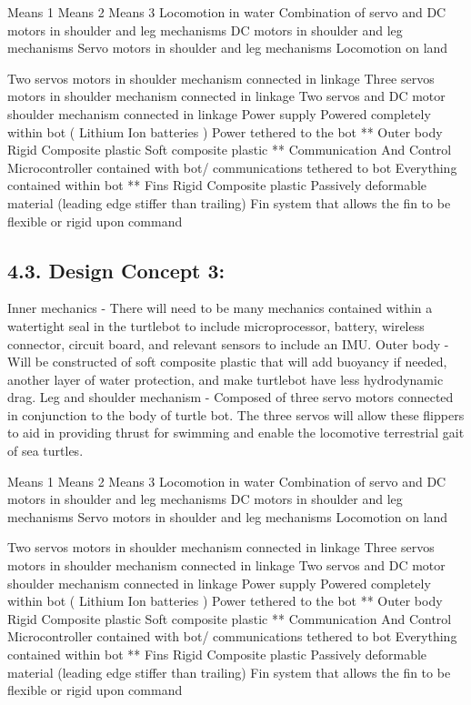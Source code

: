 \documentclass[10pt]{article}
\begin{document}
Means 1
Means 2
Means 3
Locomotion in water 
Combination of servo and DC motors in shoulder and leg mechanisms 
DC motors in shoulder and leg mechanisms
Servo motors in shoulder and leg mechanisms
Locomotion on land 

Two servos motors in shoulder mechanism connected in linkage 
Three servos motors in shoulder mechanism connected in linkage 
Two servos and DC motor shoulder mechanism connected in linkage 
Power supply 
Powered completely within bot ( Lithium Ion batteries )
Power tethered to the bot 
**
Outer body 
Rigid Composite plastic 
Soft composite plastic
**
Communication
 And Control
Microcontroller contained with bot/ communications tethered to bot
Everything contained within bot 
**
Fins 
Rigid Composite plastic
Passively deformable material (leading edge stiffer than trailing) 
Fin system that allows the fin to be flexible or rigid upon command 

\subsection{4.3. Design Concept 3:}
Inner mechanics - There will need to be many mechanics contained within a watertight seal in the turtlebot to include microprocessor, battery, wireless connector, circuit board, and relevant sensors to include an IMU.
Outer body - Will be constructed of soft composite plastic that will add buoyancy if needed, another layer of water protection, and make turtlebot have less hydrodynamic drag. 
Leg and shoulder mechanism - Composed of three servo motors connected in conjunction to the body of turtle bot. The three servos will allow these flippers to aid in providing thrust for swimming and enable the locomotive terrestrial gait of sea turtles.

Means 1
Means 2
Means 3
Locomotion in water 
Combination of servo and DC motors in shoulder and leg mechanisms 
DC motors in shoulder and leg mechanisms
Servo motors in shoulder and leg mechanisms
Locomotion on land 

Two servos motors in shoulder mechanism connected in linkage 
Three servos motors in shoulder mechanism connected in linkage 
Two servos and DC motor shoulder mechanism connected in linkage 
Power supply 
Powered completely within bot ( Lithium Ion batteries )
Power tethered to the bot 
**
Outer body 
Rigid Composite plastic 
Soft composite plastic
**
Communication
 And Control
Microcontroller contained with bot/ communications tethered to bot
Everything contained within bot 
**
Fins 
Rigid Composite plastic
Passively deformable material (leading edge stiffer than trailing) 
Fin system that allows the fin to be flexible or rigid upon command 
\end{document}
